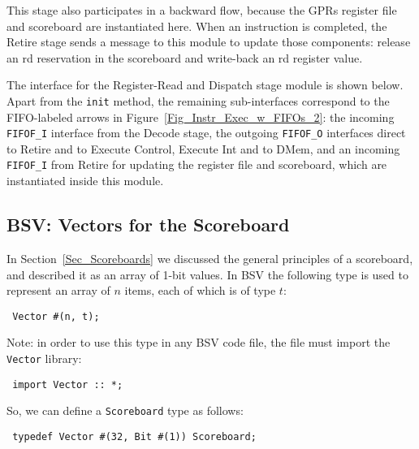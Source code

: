 This stage also participates in a backward flow, because the GPRs
register file and scoreboard are instantiated here.  When an
instruction is completed, the Retire stage sends a message to this
module to update those components: release an rd reservation in the
scoreboard and write-back an rd register value.

The interface for the Register-Read and Dispatch stage module is shown
below.  Apart from the \verb|init| method, the remaining
sub-interfaces correspond to the FIFO-labeled arrows in
Figure~\ref{Fig_Instr_Exec_w_FIFOs_2}: the incoming \verb|FIFOF_I|
interface from the Decode stage, the outgoing \verb|FIFOF_O|
interfaces direct to Retire and to Execute Control, Execute Int and to
DMem, and an incoming \verb|FIFOF_I| from Retire for updating the
register file and scoreboard, which are instantiated inside this
module.



\subsection{BSV: Vectors for the Scoreboard}

\label{Sec_Fife_Scoreboard}


In Section~\ref{Sec_Scoreboards} we discussed the general principles
of a scoreboard, and described it as an array of 1-bit values.  In BSV
the following type is used to represent an array of $n$ items, each of
which is of type $t$:

\begin{tabbing}\footnotesize\tt
\hmm Vector \#(n, t);
\end{tabbing}

Note: in order to use this type in any BSV code file, the file must
import the \verb|Vector| library:

\begin{tabbing}\footnotesize\tt
\hmm import Vector :: *;
\end{tabbing}

So, we can define a \verb|Scoreboard| type as follows:
\begin{tabbing}\footnotesize\tt
\hmm typedef  Vector \#(32, Bit \#(1))  Scoreboard;
\end{tabbing}


